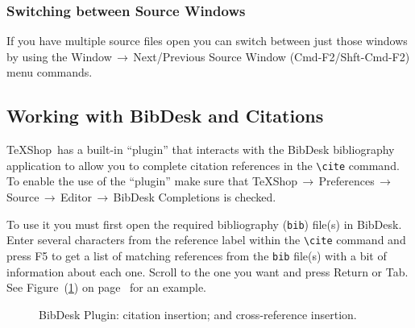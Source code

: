 \documentclass[letterpaper,11pt]{article}
\newcommand{\TS}{\textsf{\TeX Shop}}
\newcommand{\cmd}[1]{\textsf{#1}}
\newcommand{\mnu}[1]{\textsf{#1}}
\newcommand{\To}{\,\(\to\)\,}
\begin{document}
\subsubsection{Switching between Source Windows}

If you have multiple source files open you can switch between just those windows by using the \mnu{Window}\To\mnu{Next/Previous Source Window} (\cmd{Cmd-F2}/\cmd{Shft-Cmd-F2}) menu commands.

\subsection{Working with \cmd{BibDesk} and Citations}

\TS\ has a built-in ``plugin'' that interacts with the \cmd{BibDesk} bibliography application to allow you to complete citation references in the \verb|\cite| command.  To enable the use of the ``plugin'' make sure that \mnu{TeXShop}\To\mnu{Preferences}\To\mnu{Source}\To\mnu{Editor}\To\mnu{BibDesk Completions} is checked. 

To use it you must first open the required bibliography (\texttt{bib}) file(s) in \cmd{BibDesk}. Enter several characters from the reference label within the \verb|\cite| command and press \cmd{F5} to get a list of matching references from the \texttt{bib} file(s) with a bit of information about each one. Scroll to the one you want and press \cmd{Return} or \cmd{Tab}. See Figure~(\ref{fig:bibdesk}) 
on page~\pageref{fig:bibdesk} for an example.

\begin{figure}
\centering
{}%
\qquad%
%
\caption[BibDesk Plugin Use.]{
BibDesk Plugin:  citation insertion; and
 cross-reference insertion.}
\label{fig:bibdesk}
\end{figure}
\end{document}
